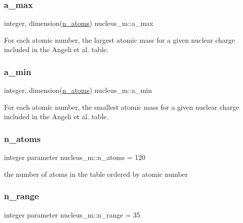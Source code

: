 \subsubsection{\texorpdfstring{a\_max}{a\_max}}
{\footnotesize\ttfamily integer, dimension(\mbox{\hyperlink{namespacenucleus__m_a97ff520812e294bf26a6b2c330f211e5}{n\+\_\+atoms}}) nucleus\+\_\+m\+::a\+\_\+max}



For each atomic number, the largest atomic mass for a given nuclear charge included in the Angeli et al. table. 

\mbox{\label{namespacenucleus__m_a8541e730d34d4c5cbb0ca885c9c5cc35}} 
\subsubsection{\texorpdfstring{a\_min}{a\_min}}
{\footnotesize\ttfamily integer, dimension(\mbox{\hyperlink{namespacenucleus__m_a97ff520812e294bf26a6b2c330f211e5}{n\+\_\+atoms}}) nucleus\+\_\+m\+::a\+\_\+min}



For each atomic number, the smallest atomic mass for a given nuclear charge included in the Angeli et al. table. 

\mbox{\label{namespacenucleus__m_a97ff520812e294bf26a6b2c330f211e5}} 
\subsubsection{\texorpdfstring{n\_atoms}{n\_atoms}}
{\footnotesize\ttfamily integer parameter nucleus\+\_\+m\+::n\+\_\+atoms = 120}



the number of atoms in the table ordered by atomic number 

\mbox{\label{namespacenucleus__m_adf953c9196f6870fe5e502b4f40bea48}} 
\subsubsection{\texorpdfstring{n\_range}{n\_range}}
{\footnotesize\ttfamily integer parameter nucleus\+\_\+m\+::n\+\_\+range = 35}



